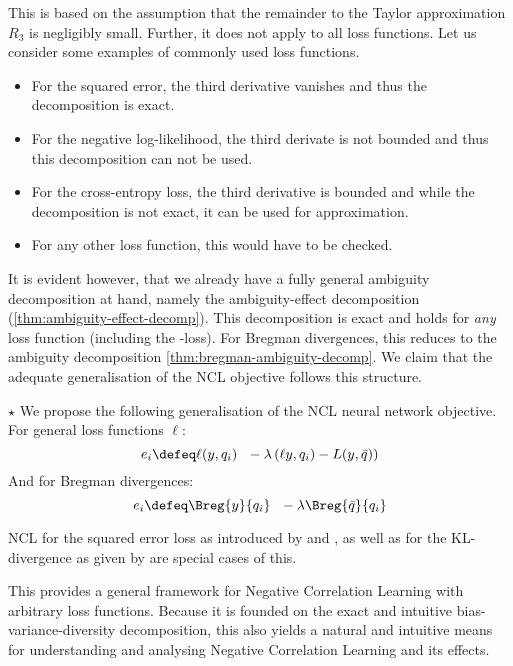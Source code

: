 \documentclass[../main.tex]{subfiles}
\begin{document}
This is based on the assumption that the remainder to the Taylor approximation $R_{3}$ is negligibly small. Further, it does not apply to all loss functions. Let us consider some examples of commonly used loss functions.
\begin{itemize}
\item For the squared error, the third derivative vanishes and thus the decomposition is exact.
\item For the negative log-likelihood,
the third derivate is not bounded and thus this decomposition can not be used.
\item For the cross-entropy loss, 
the third derivative is bounded and while the decomposition is not exact, it can be used for approximation. %
\item For any other loss function, this would have to be checked.
\end{itemize}

It is evident however, {that we already have a fully general ambiguity decomposition at hand}, namely the ambiguity-effect decomposition (\ref{thm:ambiguity-effect-decomp}). 
This decomposition is exact and holds for \textit{any} loss function (including the \zeroone-loss). 
For Bregman divergences, this reduces to the ambiguity decomposition \ref{thm:bregman-ambiguity-decomp}.
%
We claim that the adequate generalisation of the NCL objective follows this structure.
\begin{proposition} $\star$ We propose the following generalisation of the NCL neural network objective. For general loss functions $\ell$:
$$
e_{i} \defeq \ell(y, q_{i}) ~ ~ - \lambda \left( 
 \ell y, q_{i}) - L(y, \bar{q})
\right)
$$
And for Bregman divergences:
$$
e_{i} \defeq \Breg{y}{q_{i}} ~ ~ - \lambda  \Breg{\bar{q}}{q_{i}}
$$
\end{proposition}
NCL for the squared error loss as introduced by \cite{liu_EnsembleLearningNegative_1999} and \cite{brown_ManagingDiversityRegression_2005}, as well as for the KL-divergence as given by \cite{webb_EnsembleNotEnsemble_2019} are special cases of this.

This provides a general framework for Negative Correlation Learning with arbitrary loss functions. Because it is founded on the exact and intuitive bias-variance-diversity decomposition, this also yields a natural and intuitive means for understanding and analysing Negative Correlation Learning and its effects.
\end{document}
